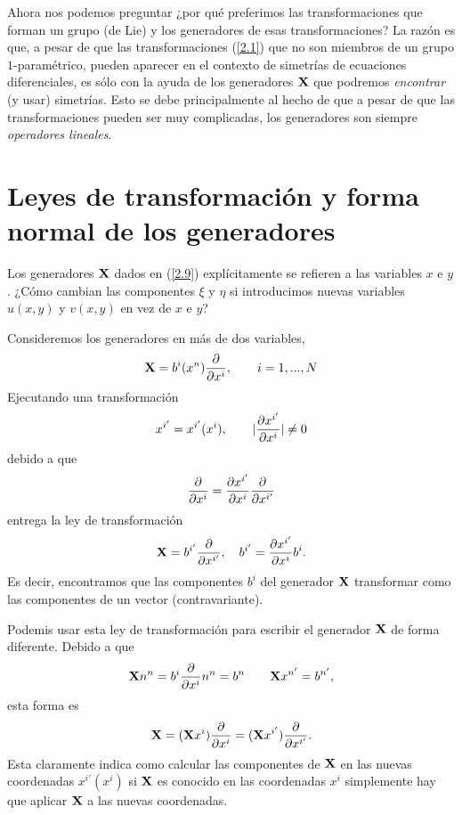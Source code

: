 Ahora nos podemos preguntar ¿por qué preferimos las transformaciones que forman un grupo (de Lie) y los generadores de esas transformaciones? La razón es que, a pesar de que las transformaciones (\ref{2.1}) que no son miembros de un grupo $1$-paramétrico, pueden aparecer en el contexto de simetrías de ecuaciones diferenciales, es sólo con la ayuda de los generadores $\vb{X}$ que podremos \textit{encontrar} (y usar) simetrías. Esto se debe principalmente al hecho de que a pesar de que las transformaciones pueden ser muy complicadas, los generadores son siempre \textit{operadores lineales}.

\section{Leyes de transformación y forma normal de los generadores}
Los generadores $\vb{X}$ dados en (\ref{2.9}) explícitamente se refieren a las variables $x$ e $y$. ¿Cómo cambian las componentes $\xi$ y $\eta$ si introducimos nuevas variables $u(x,y)$ y $v(x,y)$ en vez de $x$ e $y$?

Consideremos los generadores en más de dos variables,
\begin{equation}\label{2.18}
    \vb{X}=b^{i}(x^n)\pdv{x^{i}},\qquad i=1,...,N
\end{equation}
Ejecutando una transformación
\begin{equation}
    x^{i'}=x^{i'}(x^{i}),\qquad |\pdv{x^{i'}}{x^{i}}|\neq 0
\end{equation}
debido a que
\begin{align}
    \pdv{x^{i}}=\pdv{x^{i'}}{x^{i}}\pdv{x^{i'}}
\end{align}
entrega la ley de transformación
\begin{equation}
    \vb{X}=b^{i'}\pdv{x^{i'}},\quad b^{i'}=\pdv{x^{i'}}{x^{i}}b^{i}.
\end{equation}
Es decir, encontramos que las componentes $b^{i}$ del generador $\vb{X}$ transformar como las componentes de un vector (contravariante).

Podemis usar esta ley de transformación para escribir el generador $\vb{X}$ de forma diferente. Debido a que
\begin{equation}
    \vb{X}n^n=b^{i}\pdv{x^{i}}n^n=b^n\qquad \vb{X}x^{n'}=b^{n'},
\end{equation}
esta forma es
\begin{equation}
    \vb{X}=(\vb{X}x^{i})\pdv{x^{i}}=(\vb{X}x^{i'})\pdv{x^{i'}}.
\end{equation}
Esta claramente indica como calcular las componentes de $\vb{X}$ en las nuevas coordenadas $x^{i'}(x^{i})$ si $\vb{X}$ es conocido en las coordenadas $x^{i}$ simplemente hay que aplicar $\vb{X}$ a las nuevas coordenadas.

